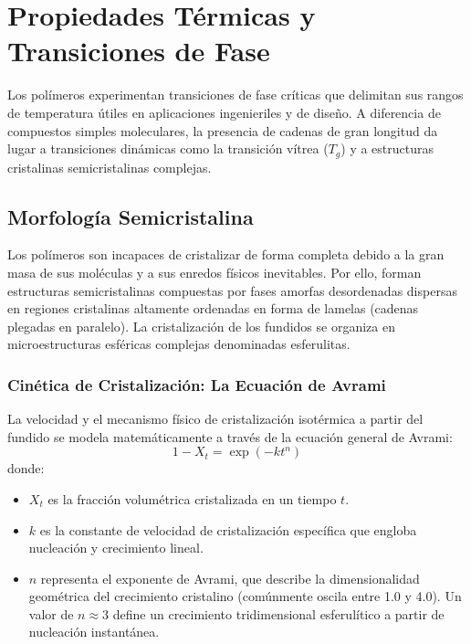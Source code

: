 \chapter{Propiedades Térmicas y Transiciones de Fase}
\label{cap:termicas}

Los polímeros experimentan transiciones de fase críticas que delimitan sus rangos de temperatura útiles en aplicaciones ingenieriles y de diseño. A diferencia de compuestos simples moleculares, la presencia de cadenas de gran longitud da lugar a transiciones dinámicas como la transición vítrea ($T_g$) y a estructuras cristalinas semicristalinas complejas.

\section{Morfología Semicristalina}

Los polímeros son incapaces de cristalizar de forma completa debido a la gran masa de sus moléculas y a sus enredos físicos inevitables. Por ello, forman estructuras semicristalinas compuestas por fases amorfas desordenadas dispersas en regiones cristalinas altamente ordenadas en forma de lamelas (cadenas plegadas en paralelo). La cristalización de los fundidos se organiza en microestructuras esféricas complejas denominadas esferulitas.

\subsection{Cinética de Cristalización: La Ecuación de Avrami}
La velocidad y el mecanismo físico de cristalización isotérmica a partir del fundido se modela matemáticamente a través de la ecuación general de Avrami:
\begin{equation}
    1 - X_t = \exp(-k t^n)
    \label{eq:avrami}
\end{equation}
donde:
\begin{itemize}
    \item $X_t$ es la fracción volumétrica cristalizada en un tiempo $t$.
    \item $k$ es la constante de velocidad de cristalización específica que engloba nucleación y crecimiento lineal.
    \item $n$ representa el exponente de Avrami, que describe la dimensionalidad geométrica del crecimiento cristalino (comúnmente oscila entre 1.0 y 4.0). Un valor de $n \approx 3$ define un crecimiento tridimensional esferulítico a partir de nucleación instantánea.
\end{itemize}

